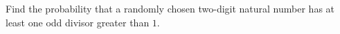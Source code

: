 Find the probability that a randomly chosen two-digit natural number has at least one odd divisor greater than $1$.

